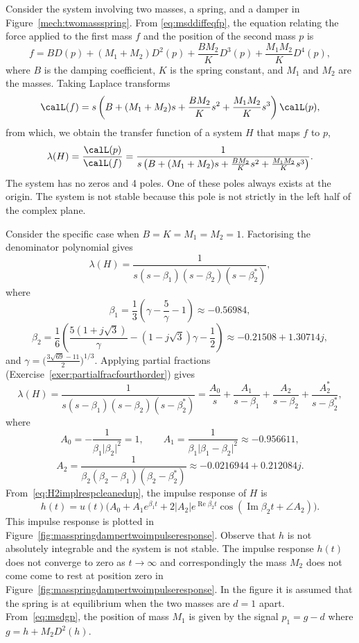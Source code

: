 \documentclass[11pt,a4paper]{book}
\theoremstyle{plain}
\numberwithin{equation}{section}
\renewcommand{\Re}{\operatorname{Re}}
\renewcommand{\Im}{\operatorname{Im}}
\newcommand{\abs}[1]{\left\vert #1 \right\vert}
\newcommand{\sabs}[1]{\vert #1 \vert}
\begin{document}
Consider the system involving two masses, a spring, and a damper in Figure~\ref{mech:twomassspring}.  From \eqref{eq:msddiffeqfp}, the equation relating the force applied to the first mass $f$ and the position of the second mass $p$ is
\[
f = B D(p) + (M_1+M_2) D^2(p) + \frac{B M_2}{K} D^3(p) + \frac{M_1 M_2}{K} D^4(p),
\]
where $B$ is the damping coefficient, $K$ is the spring constant, and $M_1$ and $M_2$ are the masses.  Taking Laplace transforms
\[
\calL(f) = s \left(B + (M_1+M_2) s + \frac{B M_2}{K} s^2 + \frac{M_1 M_2}{K} s^3 \right) \calL(p),
\]
from which, we obtain the transfer function of a system $H$ that maps $f$ to $p$,
\[
\lambda(H) = \frac{\calL(p)}{\calL(f)} = \frac{1}{s \left(B + (M_1+M_2) s + \frac{B M_2}{K} s^2 + \frac{M_1 M_2}{K} s^3 \right)}.
\]
The system has no zeros and 4 poles.  One of these poles always exists at the origin.  The system is not stable because this pole is not strictly in the left half of the complex plane.

Consider the specific case when $B=K=M_1=M_2=1$.  Factorising the denominator polynomial gives
\[
\lambda(H) = \frac{1}{s(s-\beta_1)(s-\beta_2)(s-\beta_2^*)},
\]
where 
\[
\beta_1 = \frac{1}{3}\left( \gamma - \frac{5}{\gamma} - 1 \right) \approx -0.56984,
\]
\[
\beta_2 = \frac{1}{6} \left( \frac{5(1+j\sqrt{3})}{\gamma}  - (1-j\sqrt{3})\gamma - \frac{1}{2} \right) \approx -0.21508 + 1.30714 j,
\]
and $\gamma = \big(\tfrac{3 \sqrt{69} - 11}{2}\big)^{1/3}$.  Applying partial fractions (Exercise~\ref{exer:partialfracfourthorder}) gives
\[
\lambda(H) = \frac{1}{s(s-\beta_1)(s-\beta_2)(s-\beta_2^*)} = \frac{A_0}{s} + \frac{A_1}{s-\beta_1} + \frac{A_2}{s-\beta_2} + \frac{A_2^*}{s-\beta_2^*},
\]
where 
\[
A_0 = -\frac{1}{\beta_1\sabs{\beta_2}^2} = 1, \qquad A_1 =  \frac{1}{\beta_1\sabs{\beta_1 - \beta_2}^2} \approx -0.956611, 
\]
\[
A_2 = \frac{1}{\beta_2(\beta_2-\beta_1)(\beta_2-\beta_2^*)} \approx -0.0216944 + 0.212084 j.
\]
From~\eqref{eq:H2implrespcleanedup}, the impulse response of $H$ is
\[
h(t) = u(t)\big( A_0 + A_1e^{\beta_1 t} + 2\abs{A_2} e^{\Re{\beta_2} t} \cos(\Im{\beta_2}t + \angle{A_2})  \big).
\]
This impulse response is plotted in Figure~\ref{fig:masspringdampertwoimpulseresponse}.  Observe that $h$ is not absolutely integrable and the system is not stable.  The impulse response $h(t)$ does not converge to zero as $t\to\infty$ and correspondingly the mass $M_2$ does not come come to rest at position zero in Figure~\ref{fig:masspringdampertwoimpulseresponse}.  In the figure it is assumed that the spring is at equilibrium when the two masses are $d = 1$ apart.  From~\eqref{eq:msdgp}, the position of mass $M_1$ is given by the signal $p_1 = g - d$ where $g = h + M_2D^2(h)$.
\end{document}
